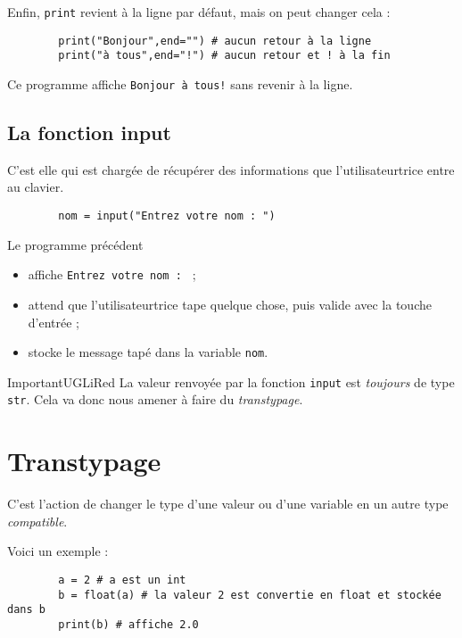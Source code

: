 Enfin, \texttt{print} revient à la ligne par défaut, mais on peut changer cela :
\begin{pyc}
    \begin{verbatim}
        print("Bonjour",end="") # aucun retour à la ligne
        print("à tous",end="!") # aucun retour et ! à la fin
    \end{verbatim}
\end{pyc}
Ce programme affiche \texttt{Bonjour à tous!} sans revenir à la ligne.

\subsection{La fonction input}
C'est elle qui est chargée de récupérer des informations que l'utilisateur\cdot trice entre au clavier.
\begin{pyc}
    \begin{verbatim}
        nom = input("Entrez votre nom : ")
    \end{verbatim}
\end{pyc}
Le programme précédent
\begin{itemize}
    \item affiche \texttt{Entrez votre nom : } ;
    \item attend que l'utilisateur\cdot trice tape quelque chose, puis valide avec la touche d'entrée ;
    \item stocke le message tapé dans la variable \texttt{nom}.
\end{itemize}
\begin{encadrecolore}{Important}{UGLiRed}
    La valeur renvoyée par la fonction \texttt{input} est \textit{toujours} de type \texttt{str}. Cela va donc nous amener à faire du \textit{transtypage}.
\end{encadrecolore}

\section{Transtypage}

\begin{definition}[ : transtypage]
    C'est l'action de changer le type d'une valeur ou d'une variable en un autre type \textit{compatible}.
\end{definition}

Voici un exemple :
\begin{pyc}
    \begin{verbatim}
        a = 2 # a est un int
        b = float(a) # la valeur 2 est convertie en float et stockée dans b
        print(b) # affiche 2.0
    \end{verbatim}
\end{pyc}


